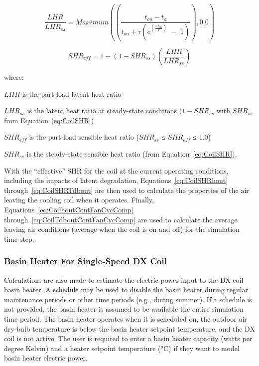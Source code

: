 \begin{equation}
\frac{{LHR}}{{LH{R_{ss}}}} = Maximum\left( {\left( {\frac{{{t_{on}} - {t_o}}}{{{t_{on}} + \tau \left( {{e^{\left( {\frac{{ - {t_{on}}}}{\tau }} \right)}}\,\, - \,\,1} \right)}}} \right),0.0} \right)
\end{equation}

\begin{equation}
SH{R_{eff}} = 1 - \left( {1 - SH{R_{ss}}} \right)\left( {\frac{{LHR}}{{LH{R_{ss}}}}} \right)
\end{equation}

where:

\(LHR\) is the part-load latent heat ratio

\(LH{R_{ss}}\) is the latent heat ratio at steady-state conditions (\(1 - SH{R_{ss}}\) with \(SH{R_{ss}}\) from Equation~\ref{eq:CoilSHR})

\(SH{R_{eff}}\) is the part-load sensible heat ratio (\(SH{R_{ss}}\) ≤ \(SH{R_{eff}}\) ≤ 1.0)

\(SH{R_{ss}}\) is the steady-state sensible heat ratio (from Equation~\ref{eq:CoilSHR}).

With the ``effective'' SHR for the coil at the current operating conditions, including the impacts of latent degradation, Equations~\ref{eq:CoilSHRhout} through~\ref{eq:CoilSHRTdbout} are then used to calculate the properties of the air leaving the cooling coil when it operates. Finally, Equations~\ref{eq:CoilhoutContFanCycComp} through~\ref{eq:CoilTdboutContFanCycComp} are used to calculate the average leaving air conditions (average when the coil is on and off) for the simulation time step.

\subsubsection{Basin Heater For Single-Speed DX Coil}\label{basin-heater-for-single-speed-dx-coil}

Calculations are also made to estimate the electric power input to the DX coil basin heater. A schedule may be used to disable the basin heater during regular maintenance periods or other time periods (e.g., during summer). If a schedule is not provided, the basin heater is assumed to be available the entire simulation time period. The basin heater operates when it is scheduled on, the outdoor air dry-bulb temperature is below the basin heater setpoint temperature, and the DX coil is not active. The user is required to enter a basin heater capacity (watts per degree Kelvin) and a heater setpoint temperature (\(^{o}\)C) if they want to model basin heater electric power.

